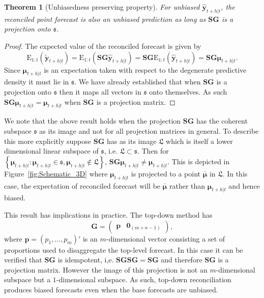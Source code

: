 \documentclass[12pt]{article}
\def\E{\text{E}}
\newtheorem{theo}{Theorem}[section]
\theoremstyle{definition}
\begin{document}
\begin{theo}[Unbiasedness preserving property]
  For unbiased $\hat{\bm{y}}_{t+h|t}$, the reconciled point forecast is also an unbiased prediction as long as $\bm{S}\bm{G}$ is a projection onto $\mathfrak{s}$.
\end{theo}
\begin{proof}
		The expected value of the reconciled forecast is given by
		\[
		\E_{1:t}(\tilde{\bm{y}}_{t+h|t})
		= \E_{1:t}(\bm{S}\bm{G}\hat{\bm{y}}_{t+h|t})
		= \bm{S}\bm{G}\E_{1:t}(\hat{\bm{y}}_{t+h|t})
		= \bm{S}\bm{G}\bm{\mu}_{t+h|t}.
		\]
  Since $\bm{\mu}_{t+h|t}$ is an expectation taken with respect to the degenerate predictive density it must lie in $\mathfrak{s}$. We have already established that when $\bm{S}\bm{G}$ is a projection onto $\mathfrak{s}$ then it maps all vectors in $\mathfrak{s}$ onto themselves. As such $\bm{S}\bm{G}\bm{\mu}_{t+h|t}=\bm{\mu}_{t+h|t}$ when $\bm{S}\bm{G}$ is a projection matrix.
\end{proof}

We note that the above result holds when the projection $\bm{S}\bm{G}$ has the coherent subspace $\mathfrak{s}$ as its image and not for all projection matrices in general. To describe this more explicitly suppose $\bm{S}\bm{G}$ has as its image $\mathfrak{L}$ which is itself a lower dimensional linear subspace of $\mathfrak{s}$, i.e. $\mathfrak{L}\subset\mathfrak{s}$. Then for $\left\{\bm{\mu}_{t+h|t}:\bm{\mu}_{t+h|t}\in\mathfrak{s},\bm{\mu}_{t+h|t}\notin\mathfrak{L}\right\}$, $\bm{S}\bm{G}\bm{\mu}_{t+h|t} \ne \bm{\mu}_{t+h|t}$. This is depicted in Figure~\ref{fig:Schematic_3D} where $\bm{\mu}_{t+h|t}$ is projected to a point $\bar{\bm{\mu}}$ in $\mathfrak{L}$. In this case, the expectation of reconciled forecast will be $\bar{\bm{\mu}}$ rather than $\bm{\mu}_{t+h|t}$ and hence biased.

This result has implications in practice. The top-down method \citep{Gross1990} has
\begin{equation*}
  \bm{G} = \begin{pmatrix}
             \bm{p} & \bm{0}_{(m \times n-1)}
           \end{pmatrix},
\end{equation*}
where $\bm{p} = (p_1,\dots,p_m)'$ is an $m$-dimensional vector consisting a set of proportions used to disaggregate the top-level forecast. In this case it can be verified that $\bm{S}\bm{G}$ is idempotent, i,e. $\bm{S}\bm{G}\bm{S}\bm{G}=\bm{S}\bm{G}$ and therefore $\bm{S}\bm{G}$ is a projection matrix. However the image of this projection is not an $m$-dimensional subspace but a $1$-dimensional subspace. As such, top-down reconciliation produces biased forecasts even when the base forecasts are unbiased.
\end{document}
